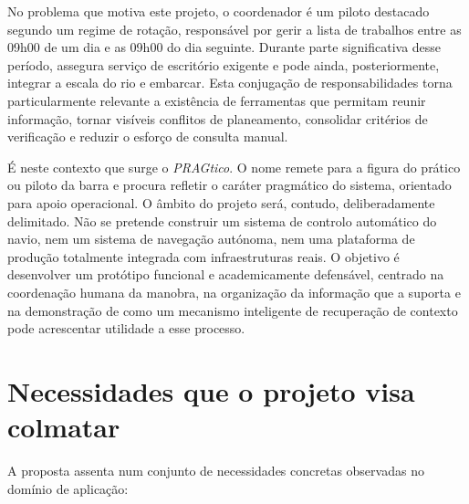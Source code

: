 \documentclass[a4paper,12pt]{report}
\begin{document}
No problema que motiva este projeto, o coordenador é um piloto destacado segundo um regime de rotação, responsável por gerir a lista de trabalhos entre as 09h00 de um dia e as 09h00 do dia seguinte. Durante parte significativa desse período, assegura serviço de escritório exigente e pode ainda, posteriormente, integrar a escala do rio e embarcar. Esta conjugação de responsabilidades torna particularmente relevante a existência de ferramentas que permitam reunir informação, tornar visíveis conflitos de planeamento, consolidar critérios de verificação e reduzir o esforço de consulta manual.

É neste contexto que surge o \textit{PRAGtico}. O nome remete para a figura do prático ou piloto da barra e procura refletir o caráter pragmático do sistema, orientado para apoio operacional. O âmbito do projeto será, contudo, deliberadamente delimitado. Não se pretende construir um sistema de controlo automático do navio, nem um sistema de navegação autónoma, nem uma plataforma de produção totalmente integrada com infraestruturas reais. O objetivo é desenvolver um protótipo funcional e academicamente defensável, centrado na coordenação humana da manobra, na organização da informação que a suporta e na demonstração de como um mecanismo inteligente de recuperação de contexto pode acrescentar utilidade a esse processo.

\section{Necessidades que o projeto visa colmatar}

A proposta assenta num conjunto de necessidades concretas observadas no domínio de aplicação:
\end{document}
